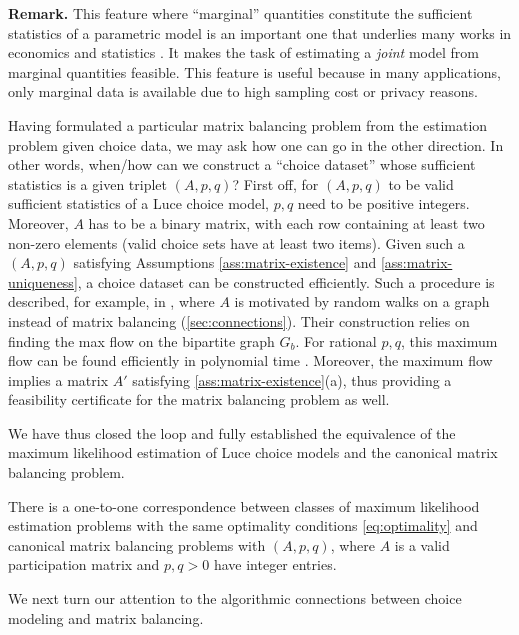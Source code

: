\textbf{Remark.} This feature where ``marginal'' quantities constitute the sufficient statistics of a parametric model is an important one that underlies many works in economics and statistics \citep{kullback1997information,stone1962multiple,good1963maximum,birch1963maximum,theil1967economics,fienberg1970iterative,berry1995automobile,fofana2002balancing,maystre2017choicerank}. It makes the task of estimating a \emph{joint} model from marginal quantities feasible. This feature is useful because in many applications, only marginal data is available due to high sampling cost or privacy reasons. 

Having formulated a particular matrix balancing problem from the estimation problem given choice data, we may ask how one can go in the other direction. In other words, when/how can we construct a ``choice dataset'' whose sufficient statistics is a given triplet $(A,p,q)$? First off, for $(A,p,q)$ to be valid sufficient statistics of a Luce choice model, $p,q$ need to be positive integers. Moreover, $A$ has to be a binary matrix, with each row containing at least two non-zero elements (valid choice sets have at least two items). Given such a $(A,p,q)$ satisfying Assumptions \ref{ass:matrix-existence} and \ref{ass:matrix-uniqueness}, a choice dataset can be constructed efficiently. Such a procedure is described, for example, in \citet{kumar2015inverting}, where $A$ is motivated
by random walks on a graph instead of matrix balancing (\cref{sec:connections}). Their construction relies on finding the max flow on the bipartite graph $G_b$. For rational $p,q$, this maximum flow can be found efficiently in polynomial time \citep{balakrishnan2004polynomial,idel2016review}. Moreover, the maximum flow implies a matrix $A'$ satisfying \cref{ass:matrix-existence}(a), thus providing a feasibility certificate for the matrix balancing problem as well. 

We have thus closed the loop and fully established the equivalence of the maximum likelihood estimation of Luce choice models and the canonical matrix balancing problem.
\begin{corollary}
    There is a one-to-one correspondence between classes of maximum likelihood estimation problems with the same optimality conditions \eqref{eq:optimality} and canonical matrix balancing problems with $(A,p,q)$, where $A$ is a valid participation matrix and $p,q>0$ have integer entries. 
\end{corollary}
We next turn our attention to the algorithmic connections between choice modeling and matrix balancing. 
